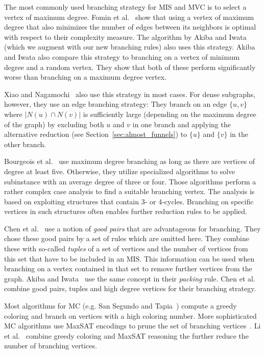 \documentclass[a4paper,UKenglish,cleveref, autoref, thm-restate]{lipics-v2021}
\begin{document}
The most commonly used branching strategy for MIS and MVC is to select a vertex
of maximum degree. Fomin et al.~\cite{Fomin} show that using a vertex of maximum
degree that also minimizes the number of edges between its neighbors is optimal
with respect to their complexity measure. The algorithm by Akiba and Iwata~\cite{AkibaIwata}
(which we augment with our new branching rules) also uses this strategy. Akiba and Iwata also
compare this strategy to branching on a vertex of minimum degree and a random
vertex. They show that both of these perform significantly worse than branching
on a maximum degree vertex.

Xiao and Nagamochi~\cite{XiaoNagamochi} also use
this strategy in most cases. For dense subgraphs, however, they use an edge
branching strategy: They branch on an edge $\{u, v\}$ where $|N(u) \cap N(v)|$
is sufficiently large (depending on the maximum degree of the graph) by
excluding both $u$ and $v$ in one branch and applying the alternative reduction
(see Section~\ref{sec:almost_funnels}) to $\{u\}$ and $\{v\}$ in the other branch.

Bourgeois et al.~\cite{Bourgeois} use maximum degree branching as long as there are vertices of degree at least five. Otherwise, they utilize specialized algorithms to solve subinstance with an average degree of three or four. Those algorithms perform a rather complex case analysis to find a suitable branching vertex. The analysis is based on exploiting structures that contain 3- or 4-cycles. Branching on specific vertices in such structures often enables further reduction rules to be applied.

Chen et al.~\cite{ChenXiaKanj} use a notion of \emph{good pairs} that are advantageous
for branching. They chose these good pairs by a set of rules which are omitted
here. They combine these with so-called \emph{tuples} of a set of vertices and the
number of vertices from this set that have to be included in an MIS. This
information can be used when branching on a vertex
contained in that set to remove further vertices from the graph. Akiba and
Iwata~\cite{AkibaIwata} use the same concept in their \emph{packing} rule. Chen
et al. combine good pairs, tuples and high degree vertices for their branching strategy.

Most algorithms for MC (e.g. San Segundo and Tapia~\cite{Color}) compute a
greedy coloring and branch on vertices with a high coloring number.
More sophisticated MC algorithms use MaxSAT encodings to prune the set of
branching vertices~\cite{LiFangXu,LiJiang,LiQuan}. Li et al.~\cite{LiMaxSat}
combine greedy coloring and MaxSAT reasoning the further reduce the number of
branching vertices.
\end{document}
